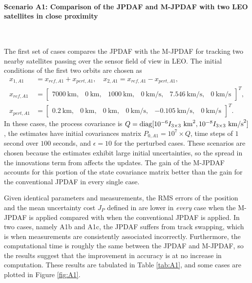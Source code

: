 \paragraph*{Scenario A1: Comparison of the JPDAF and M-JPDAF with two LEO satellites in close proximity}\ 

The first set of cases compares the JPDAF with the M-JPDAF for tracking two nearby satellites passing over the sensor field of view in LEO. The initial conditions of the first two orbits are chosen as
\begin{align}
x_{1,A1}&=x_{ref,A1}+x_{pert,A1}, \quad x_{2,A1}=x_{ref,A1}-x_{pert,A1},\nonumber
\\
x_{ref,A1}&=\begin{bmatrix}7000\ \text{km}, & 0\ \text{km}, & 1000\ \text{km}, & 0\ \text{km/s}, & 7.546\ \text{km/s}, & 0\ \text{km/s}\end{bmatrix}^T,
\nonumber\\
x_{pert,A1}&=\begin{bmatrix}
0.2\ \text{km}, & 0\ \text{km}, & 0\ \text{km}, & 0\ \text{km/s}, & -0.105\ \text{km/s}, & 0\ \text{km/s}
\end{bmatrix}^T.\nonumber
\end{align}
In these cases, the process covariance is $Q=\mathop{\mathrm{diag}}\nolimits[10^{-6}I_{3\times3}\ \text{km}^2, 10^{-8}I_{3\times3}\ \text{km/s}^2]$, the estimates have initial covariances matrix $P_{0,A1}=10^7\times Q$, time steps of $1$ second over $100$ seconds, and $\epsilon=10$ for the perturbed cases.
These scenarios are chosen because the estimates exhibit large initial uncertainties, so the spread in the innovations term from  affects the updates.
The gain of the M-JPDAF accounts for this portion of the state covariance matrix better than the gain for the conventional JPDAF in every single case.

Given identical parameters and measurements, the RMS errors of the position and the mean uncertainty cost $J_P$ defined in  are lower in \emph{every} case when the M-JPDAF is applied compared with when the conventional JPDAF is applied.
In two cases, namely A1b and A1c, the JPDAF suffers from track swapping, which is when measurements are consistently associated incorrectly.
Furthermore, the computational time is roughly the same between the JPDAF and M-JPDAF, so the results suggest that the improvement in accuracy is at no increase in computation.
These results are tabulated in Table \ref{tab:A1}, and some cases are plotted in Figure \ref{fig:A1}.


